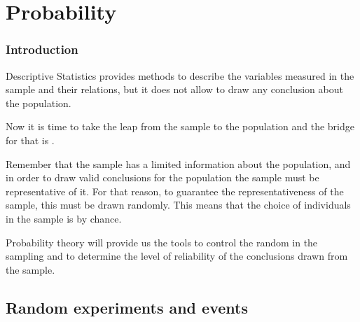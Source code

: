 \section{Probability}



\begin{frame}
\frametitle{Introduction}
Descriptive Statistics provides methods to describe the variables measured in the sample and their relations, but it does not allow to draw any conclusion about the population.

Now it is time to take the leap from the sample to the population and the bridge for that is .

Remember that the sample has a limited information about the population, and in order to draw valid conclusions for the population the sample must be representative of it.
For that reason, to guarantee the representativeness of the sample, this must be drawn randomly. 
This means that the choice of individuals in the sample is by chance. 

Probability theory will provide us the tools to control the random in the sampling and to determine the level of reliability of the conclusions drawn from the sample. 
\end{frame}


\subsection{Random experiments and events}

